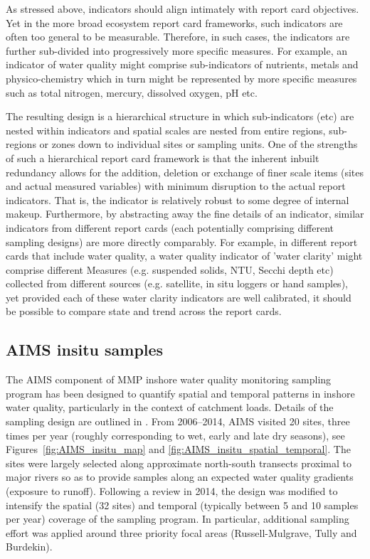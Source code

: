 As stressed above, indicators should align intimately with report card objectives.  Yet in the more
broad ecosystem report card frameworks, such indicators are often too general to be measurable.
Therefore, in such cases, the indicators are further sub-divided into progressively more specific
measures.  For example, an indicator of water quality might comprise sub-indicators of nutrients,
metals and physico-chemistry which in turn might be represented by more specific measures such as
total nitrogen, mercury, dissolved oxygen, pH etc.

The resulting design is a hierarchical structure in which sub-indicators (etc) are nested within
indicators and spatial scales are nested from entire regions, sub-regions or zones down to
individual sites or sampling units.  One of the strengths of such a hierarchical report card
framework is that the inherent inbuilt redundancy allows for the addition, deletion or exchange of
finer scale items (sites and actual measured variables) with minimum disruption to the actual report
indicators.  That is, the indicator is relatively robust to some degree of internal makeup.
Furthermore, by abstracting away the fine details of an indicator, similar indicators from different
report cards (each potentially comprising different sampling designs) are more directly comparably.
For example, in different report cards that include water quality, a water quality indicator of
'water clarity' might comprise different Measures (e.g. suspended solids, NTU, Secchi depth etc)
collected from different sources (e.g. satellite, in situ loggers or hand samples), yet provided
each of these water clarity indicators are well calibrated, it should be possible to compare state
and trend across the report cards.
  
   
   
  
\subsection{AIMS insitu samples}

The AIMS component of MMP inshore water quality monitoring sampling program has been designed to
quantify spatial and temporal patterns in inshore water quality, particularly in the context of
catchment loads.  Details of the sampling design are outlined in \citep{Lonborg-MMP-2015}.  From
2006--2014, AIMS visited 20 sites, three times per year (roughly corresponding to wet, early and
late dry seasons), see Figures~\ref{fig:AIMS_insitu_map} and \ref{fig:AIMS_insitu_spatial_temporal}.
The sites were largely selected along approximate north-south transects proximal to major rivers so
as to provide samples along an expected water quality gradients (exposure to runoff).  Following a
review in 2014, the design was modified to intensify the spatial (32 sites) and temporal (typically
between 5 and 10 samples per year) coverage of the sampling program.  In particular, additional
sampling effort was applied around three priority focal areas (Russell-Mulgrave, Tully and
Burdekin).


